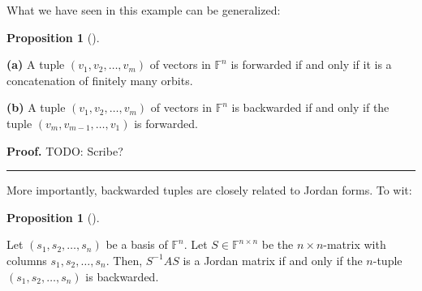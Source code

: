 \documentclass[numbers=enddot,12pt,final,onecolumn,notitlepage]{scrartcl}%
\numberwithin{exer}{subsection}
\theoremstyle{definition}
\newtheorem{prop}[theo]{Proposition}
\newenvironment{proposition}[1][]
{\begin{prop}[#1]\begin{leftbar}}
{\end{leftbar}\end{prop}}
\newenvironment{proof}[1][Proof]{\noindent\textbf{#1.} }{\ \rule{0.5em}{0.5em}}
\begin{document}
What we have seen in this example can be generalized:

\begin{proposition}
\label{prop.jnf.exist.step3.bwd}\textbf{(a)} A tuple $\left(  v_{1}%
,v_{2},\ldots,v_{m}\right)  $ of vectors in $\mathbb{F}^{n}$ is forwarded if
and only if it is a concatenation of finitely many orbits. \medskip

\textbf{(b)} A tuple $\left(  v_{1},v_{2},\ldots,v_{m}\right)  $ of vectors in
$\mathbb{F}^{n}$ is backwarded if and only if the tuple $\left(  v_{m}%
,v_{m-1},\ldots,v_{1}\right)  $ is forwarded.
\end{proposition}

\begin{proof}
TODO: Scribe?
\end{proof}

More importantly, backwarded tuples are closely related to Jordan forms. To wit:

\begin{proposition}
\label{prop.jnf.exist.step3.basis}Let $\left(  s_{1},s_{2},\ldots
,s_{n}\right)  $ be a basis of $\mathbb{F}^{n}$. Let $S\in\mathbb{F}^{n\times
n}$ be the $n\times n$-matrix with columns $s_{1},s_{2},\ldots,s_{n}$. Then,
$S^{-1}AS$ is a Jordan matrix if and only if the $n$-tuple $\left(
s_{1},s_{2},\ldots,s_{n}\right)  $ is backwarded.
\end{proposition}
\end{document}

